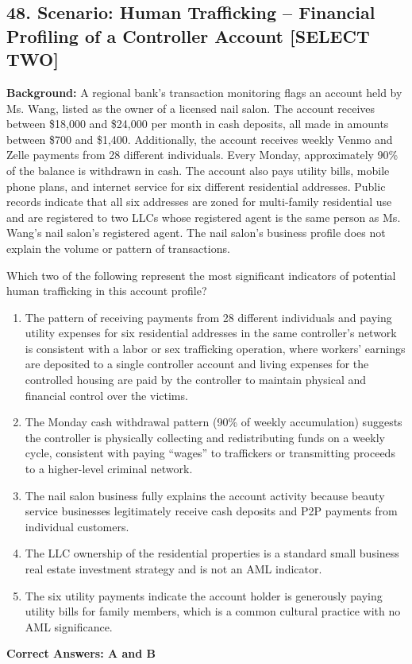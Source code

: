 \documentclass[11pt,a4paper]{article}
\begin{document}
	\subsection{48. Scenario: Human Trafficking -- Financial Profiling of a Controller Account \textnormal{[SELECT TWO]}}
	
	\textbf{Background:} A regional bank's transaction monitoring flags an account held by Ms. Wang, listed as the owner of a licensed nail salon. The account receives between \$18,000 and \$24,000 per month in cash deposits, all made in amounts between \$700 and \$1,400. Additionally, the account receives weekly Venmo and Zelle payments from 28 different individuals. Every Monday, approximately 90\% of the balance is withdrawn in cash. The account also pays utility bills, mobile phone plans, and internet service for six different residential addresses. Public records indicate that all six addresses are zoned for multi-family residential use and are registered to two LLCs whose registered agent is the same person as Ms. Wang's nail salon's registered agent. The nail salon's business profile does not explain the volume or pattern of transactions.
	
	Which two of the following represent the most significant indicators of potential human trafficking in this account profile?
	
	\begin{enumerate}[label=\Alph*.]
		\item The pattern of receiving payments from 28 different individuals and paying utility expenses for six residential addresses in the same controller's network is consistent with a labor or sex trafficking operation, where workers' earnings are deposited to a single controller account and living expenses for the controlled housing are paid by the controller to maintain physical and financial control over the victims.
		\item The Monday cash withdrawal pattern (90\% of weekly accumulation) suggests the controller is physically collecting and redistributing funds on a weekly cycle, consistent with paying ``wages'' to traffickers or transmitting proceeds to a higher-level criminal network.
		\item The nail salon business fully explains the account activity because beauty service businesses legitimately receive cash deposits and P2P payments from individual customers.
		\item The LLC ownership of the residential properties is a standard small business real estate investment strategy and is not an AML indicator.
		\item The six utility payments indicate the account holder is generously paying utility bills for family members, which is a common cultural practice with no AML significance.
	\end{enumerate}
	\textbf{Correct Answers: A and B}
	
\end{document}
